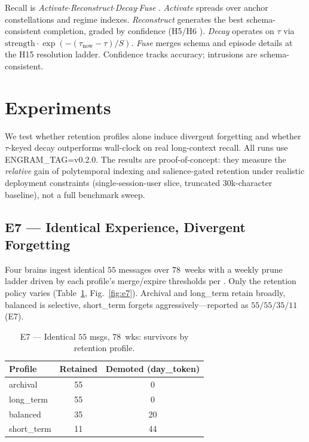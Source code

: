 \documentclass[letterpaper]{article}
\begin{document}
Recall is \emph{Activate}$\cdot$\emph{Reconstruct}$\cdot$\emph{Decay}$\cdot$\emph{Fuse} \citep{collins1975spreading,bartlett1932remembering,zhong2023memorybank,zacks2007event}. \emph{Activate} spreads over anchor constellations and regime indexes. \emph{Reconstruct} generates the best schema-consistent completion, graded by confidence (H5/H6 \citep{bartlett1932remembering}). \emph{Decay} operates on $\tau$ via $\text{strength}\cdot\exp(-(\tau_{\text{now}}-\tau)/S)$. \emph{Fuse} merges schema and episode details at the H15 resolution ladder. Confidence tracks accuracy; intrusions are schema-consistent.

\section{Experiments}
We test whether retention profiles alone induce divergent forgetting and whether $\tau$-keyed decay outperforms wall-clock on real long-context recall. All runs use ENGRAM\_TAG=v0.2.0. The results are proof-of-concept: they measure the \emph{relative} gain of polytemporal indexing and salience-gated retention under realistic deployment constraints (single-session-user slice, truncated $30$k-character baseline), not a full benchmark sweep.

\subsection{E7 --- Identical Experience, Divergent Forgetting}
Four brains ingest identical $55$ messages over $78$~weeks with a weekly prune ladder driven by each profile's merge/expire thresholds per \citet{zhong2023memorybank}. Only the retention policy varies (Table~\ref{tab:e7}, Fig.~\ref{fig:e7}). Archival and long\_term retain broadly, balanced is selective, short\_term forgets aggressively---reported as $55/55/35/11$ (E7).

\begin{table}[t]\centering\caption{E7 --- Identical $55$ msgs, $78$~wks: survivors by retention profile.}\label{tab:e7}
\begin{tabular}{lcc}\toprule
Profile & Retained & Demoted (day\_token) \\ \midrule
archival & 55 & 0 \\
long\_term & 55 & 0 \\
balanced & 35 & 20 \\
short\_term & 11 & 44 \\ \bottomrule
\end{tabular}
\end{table}
\end{document}
